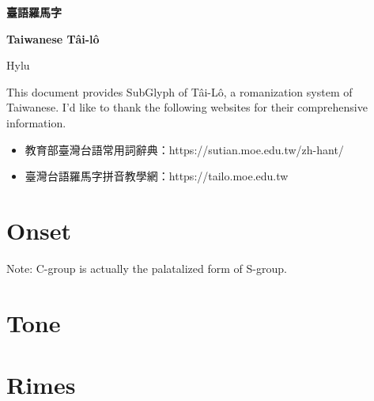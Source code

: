 \documentclass[12pt]{article}
\begin{document}

\begin{center}
    {\Huge \textbf{臺語羅馬字} \par}
    {\Huge \textbf{Taiwanese Tâi-lô} \par}
    {\Large Hylu \par}
    \hrulefill
\end{center}

This document provides SubGlyph of Tâi-Lô, a romanization system of Taiwanese. I'd like to thank the following websites for their comprehensive information. \par
\begin{itemize}
	\item 教育部臺灣台語常用詞辭典：https://sutian.moe.edu.tw/zh-hant/
	\item 臺灣台語羅馬字拼音教學網：https://tailo.moe.edu.tw
\end{itemize}

\section{Onset}
%
Note: C-group is actually the palatalized form of S-group. \par

\clearpage

\section{Tone}
%

\section{Rimes}
%
\clearpage
%
\end{document}
